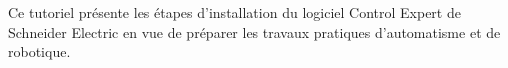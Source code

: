 Ce tutoriel présente les étapes d'installation du logiciel Control Expert de Schneider Electric en vue de préparer les travaux pratiques d'automatisme et de robotique.
